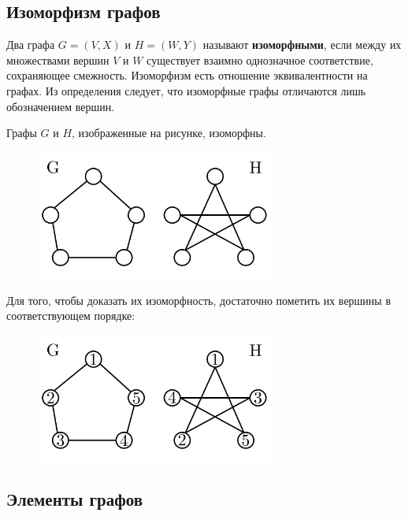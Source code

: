 \subsection{Изоморфизм графов}

Два графа \(G = (V, X)\) и \(H = (W, Y)\) называют \textbf{изоморфными}, если между их множествами вершин \(V\) и \(W\) существует взаимно однозначное соответствие, сохраняющее смежность. Изоморфизм есть отношение эквивалентности на графах. Из определения следует, что изоморфные графы отличаются лишь обозначением вершин.

\begin{example*}
    Графы \(G\) и \(H\), изображенные на рисунке, изоморфны.
    \begin{figure}[H]
        \centering
        \includegraphics[width=0.7\textwidth]{./images/graph-isomorphism-1.png}
    \end{figure}

    Для того, чтобы доказать их изоморфность, достаточно пометить их вершины в соответствующем порядке:
    \begin{figure}[H]
        \centering
        \includegraphics[width=0.7\textwidth]{./images/graph-isomorphism-2.png}
    \end{figure}
\end{example*}

\subsection{Элементы графов}

